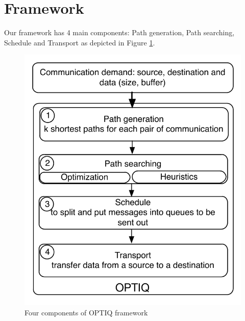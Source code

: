 \section{Framework}
\label{sec:framework}

Our framework has 4 main components: Path generation, Path searching, Schedule and Transport as depicted in Figure \ref{fig:framework}.

\begin{figure}[!htb]
\vspace{-0.1in}
\centering
\includegraphics[scale=0.7]{figures/framework.pdf}
\vspace{-0.1in}
\caption{Four components of OPTIQ framework}
\vspace{-0.1in}
\label{fig:framework}
\end{figure}

